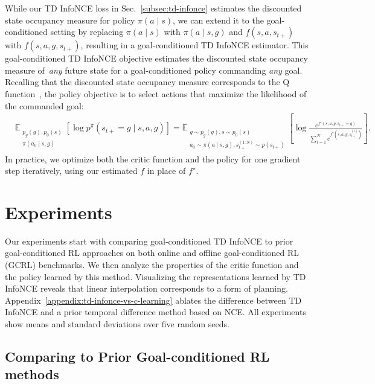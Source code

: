 \documentclass{article} %
\begin{document}
While our TD InfoNCE loss in Sec.~\ref{subsec:td-infonce} estimates the discounted state occupancy measure for policy $\pi(a \mid s)$, we can extend it to the goal-conditioned setting by replacing $\pi(a \mid s)$ with $\pi(a \mid s, g)$ and $f(s, a, s_{t+})$ with $f(s, a, g, s_{t+})$, resulting in a goal-conditioned TD InfoNCE estimator. This goal-conditioned TD InfoNCE objective estimates the discounted state occupancy measure of~\emph{any} future state for a goal-conditioned policy commanding \emph{any} goal.
Recalling that the discounted state occupancy measure corresponds to the Q function~\citep{eysenbach2022contrastive}, the policy objective is to select actions that maximize the likelihood of the commanded goal:
\begin{align}
    &\mathbb{E}_{\substack{p_g(g),  p_0(s) \\ \pi(a_0 \mid s, g)}} \left[ \log p^{\pi}(s_{t+} = g \mid s, a, g) \right] = \mathbb{E}_{\substack{ g \sim p_g(g), s \sim p_0(s) \\ a_0 \sim \pi(a \mid s, g), s_{t+}^{(1:N)} \sim p(s_{t+}) }} \left[ \log \frac{e^{f^{\star}(s, a, g, s_{t+} = g )}}{ \sum_{i = 1}^N e^{ f^{\star}(s, a, g, s_{t+}^{(i)}) } } \right].
    \label{eq:actor-loss}
\end{align}
In practice, we optimize both the critic function and the policy for one gradient step iteratively, using our estimated $f$ in place of $f^{\star}$.


\section{Experiments}
\label{sec:experiments}

Our experiments start with comparing goal-conditioned TD InfoNCE to prior goal-conditioned RL approaches on both online and offline goal-conditioned RL (GCRL) benchmarks. We then analyze the properties of the critic function and the policy learned by this method. Visualizing the representations learned by TD InfoNCE reveals that linear interpolation corresponds to a form of planning. Appendix~\ref{appendix:td-infonce-vs-c-learning} ablates the difference between TD InfoNCE and a prior temporal difference method based on NCE. All experiments show means and standard deviations over five random seeds.

\subsection{Comparing to Prior Goal-conditioned RL methods}
\end{document}
